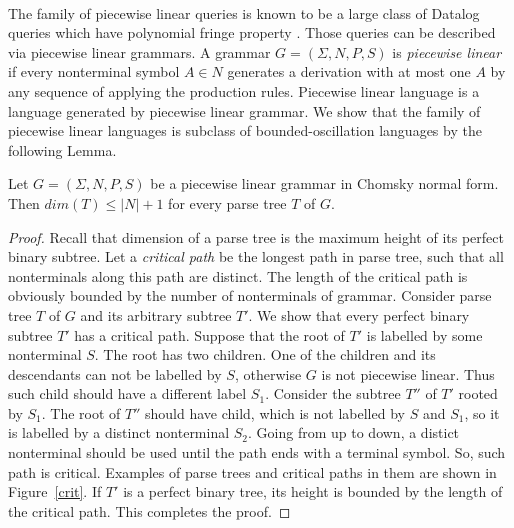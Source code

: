 \begin{example}
\\
The family of piecewise linear queries is known to be a large class of Datalog queries which have polynomial fringe property \cite{Ullman}. Those queries can be described via piecewise linear grammars. A grammar $G = (\Sigma, N, P, S)$ is \textit{piecewise linear} if every nonterminal symbol $A \in N$ generates a derivation with at most one $A$ by any sequence of applying the production rules. Piecewise linear language is a language generated by piecewise linear grammar. We show that the family of piecewise linear languages is subclass of bounded-oscillation languages by the following Lemma.
\begin{lemma}
Let  $G = (\Sigma, N, P, S)$ be a piecewise linear grammar in Chomsky normal form. Then $dim(T) \le |N| + 1$ for every parse tree $T$ of $G$.
\end{lemma}
\begin{proof} Recall that dimension of a parse tree is the maximum height of its perfect binary subtree. Let a \textit{critical path} be the longest path in parse tree, such that all nonterminals along this path are distinct. The length of the critical path is obviously bounded by the number of nonterminals of grammar.  Consider parse tree $T$ of $G$ and its arbitrary subtree $T'$. We show that every perfect binary subtree $T'$ has a critical path. Suppose that the root of $T'$ is labelled by some nonterminal $S$. The root has two children. One of the children and its descendants can not be labelled by $S$, otherwise $G$ is not piecewise linear. Thus such child should have a different label $S_1$. Consider the subtree $T''$ of $T'$ rooted by $S_1$. The root of $T''$ should have child, which is not labelled by $S$ and $S_1$, so it is labelled by a distinct nonterminal $S_2$. Going from up to down, a distict nonterminal should be used until the path ends with a terminal symbol. So, such path is critical. Examples of parse trees and critical paths in them are shown in Figure~\ref{crit}. If $T'$ is a perfect binary tree, its height is bounded by the length of the critical path. This completes the proof.
\end{proof}
\begin{figure}
\begin{tikzpicture}[level 2/.style={sibling distance=8mm}]

\end{tikzpicture}
\end{figure}
\end{example}
